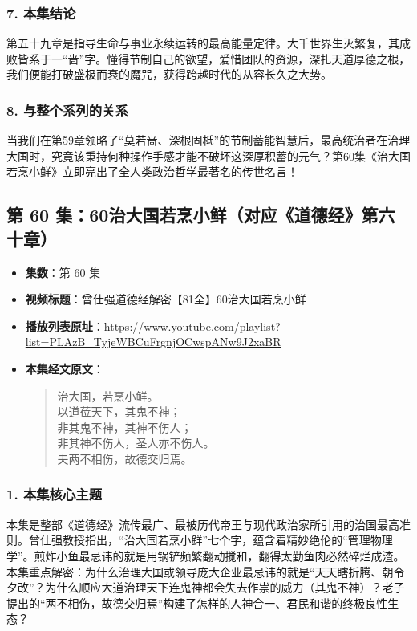 \subsubsection{7. 本集结论}
第五十九章是指导生命与事业永续运转的最高能量定律。大千世界生灭繁复，其成败皆系于一“啬”字。懂得节制自己的欲望，爱惜团队的资源，深扎天道厚德之根，我们便能打破盛极而衰的魔咒，获得跨越时代的从容长久之大势。

\subsubsection{8. 与整个系列的关系}
当我们在第59章领略了“莫若啬、深根固柢”的节制蓄能智慧后，最高统治者在治理大国时，究竟该秉持何种操作手感才能不破坏这深厚积蓄的元气？第60集《治大国若烹小鲜》立即亮出了全人类政治哲学最著名的传世名言！

\clearpage

\subsection{第 60 集：60治大国若烹小鲜（对应《道德经》第六十章）}
\label{sec:ep60}

\begin{itemize}
    \item \textbf{集数}：第 60 集
    \item \textbf{视频标题}：曾仕强道德经解密【81全】60治大国若烹小鲜
    \item \textbf{播放列表原址}：\url{https://www.youtube.com/playlist?list=PLAzB_TyjeWBCuFrgnjOCwspANw9J2xaBR}
    \item \textbf{本集经文原文}：
    \begin{quote}\kaishu
    治大国，若烹小鲜。\\
    以道莅天下，其鬼不神；\\
    非其鬼不神，其神不伤人；\\
    非其神不伤人，圣人亦不伤人。\\
    夫两不相伤，故德交归焉。
    \end{quote}
\end{itemize}

\subsubsection{1. 本集核心主题}
本集是整部《道德经》流传最广、最被历代帝王与现代政治家所引用的治国最高准则。曾仕强教授指出，“治大国若烹小鲜”七个字，蕴含着精妙绝伦的“管理物理学”。煎炸小鱼最忌讳的就是用锅铲频繁翻动搅和，翻得太勤鱼肉必然碎烂成渣。本集重点解密：为什么治理大国或领导庞大企业最忌讳的就是“天天瞎折腾、朝令夕改”？为什么顺应大道治理天下连鬼神都会失去作祟的威力（其鬼不神）？老子提出的“两不相伤，故德交归焉”构建了怎样的人神合一、君民和谐的终极良性生态？

